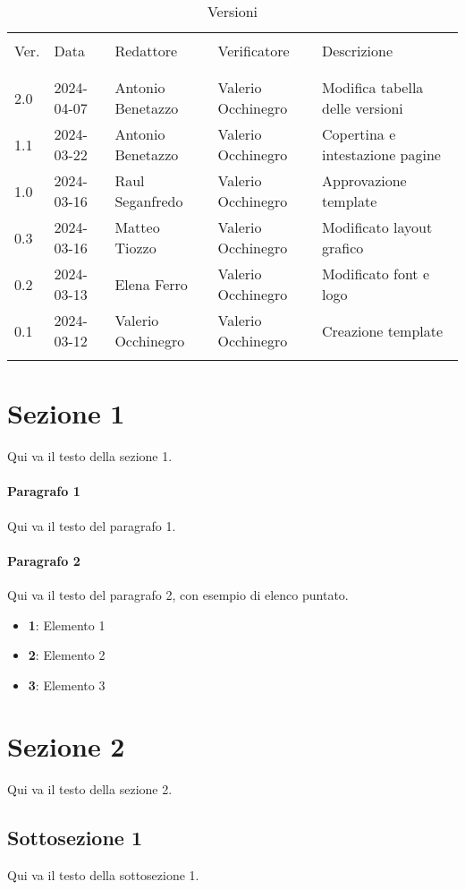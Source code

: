 \documentclass[italian,12pt]{article}
\begin{document}


\newpage



\begin{table}[!h]
	\caption{Versioni}
	\footnotesize
	\begin{center}
		\begin{tabular}{ l l l l p{6cm} }
			\hline                                                                                        \\[-2ex]
			Ver. & Data       & Redattore          & Verificatore       & Descrizione                     \\
			\\[-2ex] \hline \\[-1.5ex]
			2.0  & 2024-04-07 & Antonio Benetazzo  & Valerio Occhinegro & Modifica tabella delle versioni \\
			1.1  & 2024-03-22 & Antonio Benetazzo  & Valerio Occhinegro & Copertina e intestazione pagine \\
			1.0  & 2024-03-16 & Raul Seganfredo    & Valerio Occhinegro & Approvazione template           \\
			0.3  & 2024-03-16 & Matteo Tiozzo      & Valerio Occhinegro & Modificato layout grafico       \\
			0.2  & 2024-03-13 & Elena Ferro        & Valerio Occhinegro & Modificato font e logo          \\
			0.1  & 2024-03-12 & Valerio Occhinegro & Valerio Occhinegro & Creazione template              \\
			\\[-1.5ex] \hline
		\end{tabular}
	\end{center}
\end{table}

\newpage

\tableofcontents

\newpage

\section{Sezione 1}
Qui va il testo della sezione 1.

\paragraph{Paragrafo 1}
Qui va il testo del paragrafo 1.

\paragraph{Paragrafo 2}
Qui va il testo del paragrafo 2, con esempio di elenco puntato.
\begin{itemize}
	\itemsep0em
	\item \textbf{1}: Elemento 1
	\item \textbf{2}: Elemento 2
	\item \textbf{3}: Elemento 3
\end{itemize}



\section{Sezione 2}
Qui va il testo della sezione 2.
\subsection{Sottosezione 1}
Qui va il testo della sottosezione 1.
\end{document}
